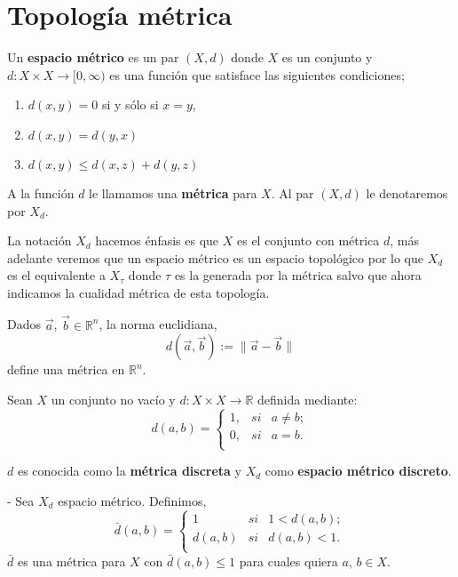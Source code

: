 \section*{Topología métrica}
Un \textbf{espacio métrico} es un par $(X, d)$ donde $X$ es un conjunto y $d:X \times X \to [0, \infty)$ es una función que satisface las siguientes condiciones;

\begin{enumerate}
\item $d(x,y)=0$ si y sólo si $x=y$,
\item $d(x,y)=d(y,x)$
\item $d(x,y) \leq d(x,z)+d(y,z)$
\end{enumerate}


A la función $d$ le llamamos una \textbf{métrica} para $X$. Al par $(X,d)$ le denotaremos por $X_d$. 

\begin{ob}
La notación $X_d$ hacemos énfasis es que $X$ es el conjunto con métrica $d$, más adelante veremos que un espacio métrico es un espacio topológico por lo que $X_d$ es el equivalente a $X_\tau$ donde $\tau$ es la generada por la métrica salvo que ahora indicamos la cualidad métrica de esta topología.  
\end{ob}

\begin{ej}
 Dados $\vec{a}$, $\vec{b} \in \mathbb{R}^{n}$, la norma euclidiana,
$$d(\vec{a},\vec{b}):=\parallel \vec{a}-\vec{b} \parallel$$
define una métrica en $\mathbb{R}^{n}$.
\end{ej}

\begin{ej}
 Sean $X$ un conjunto no vacío y $d : X \times X \to\mathbb{R}$ definida mediante:
$$d(a,b)=\left\{
\begin{array}{lcc}
1, & si & a \neq b; \\
0, & si & a=b. \\
\end{array}
\right.$$

$d$ es conocida como la \textbf{métrica discreta} y  $X_{d}$ como \textbf{espacio métrico discreto}.
\end{ej}

\begin{ej}\label{ejem:metrica-acotada}
- Sea $X_{d}$ espacio métrico. Definimos,
$$\bar{d}(a,b)=\left\{
\begin{array}{lcc}
1 & si & 1 < d(a,b);   \\
d(a,b) & si & d(a,b)<1. \\
\end{array}
\right.
$$
$\bar{d}$ es una métrica para $X$ con $\bar{d}(a,b)\leq 1$ para cuales quiera $a$, $b \in X.$ 
\end{ej}


